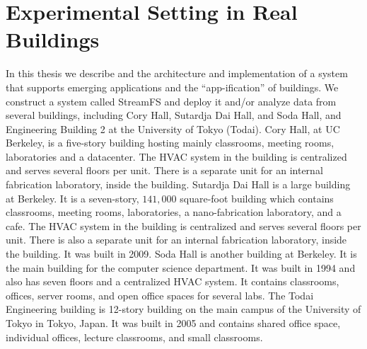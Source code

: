 \section{Experimental Setting in Real Buildings}
In this thesis we describe and the architecture and implementation of a system that supports emerging applications and the ``app-ification''
of buildings.  We construct a system called StreamFS and deploy it and/or analyze data from several buildings, including
Cory Hall, Sutardja Dai Hall, and Soda Hall, and Engineering Building 2 at the University of Tokyo (Todai).
Cory Hall, at UC Berkeley, is a five-story building hosting mainly classrooms, meeting rooms, laboratories and a datacenter.
The HVAC system in the building is centralized and serves several floors per unit.
There is a separate unit for an internal fabrication laboratory, inside the building.
Sutardja Dai Hall is a large building at Berkeley.  It is a seven-story, $141,000$ square-foot 
 building which contains classrooms, meeting rooms, laboratories, a nano-fabrication laboratory, and a cafe.
The HVAC system in the building is centralized and serves several floors per unit.
There is also a separate unit for an internal fabrication laboratory, inside the building.  It was built in 2009.
Soda Hall is another building at Berkeley.  It is the main building for the computer science department.
It was built in 1994 and also has seven floors and a centralized HVAC system.  It contains classrooms, 
offices, server rooms, and open office spaces for several labs.
The Todai Engineering building is 12-story building on the main campus of the University of Tokyo in Tokyo, Japan.
It was built in 2005 and contains shared office space, individual offices, lecture classrooms, and small
classrooms.

